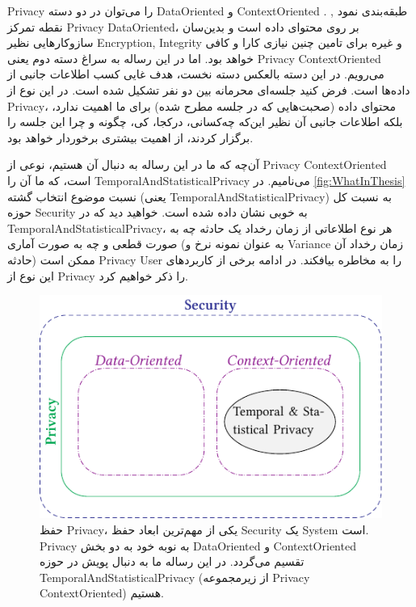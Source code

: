 \gls{Privacy}
را می‌توان در دو دسته
\gls{DataOriented} و \gls{ContextOriented}
طبقه‌بندی نمود
\cite[بخش $12.4.1$]{guizani2015future}, \cite[صفحه 202]{mason2014sensing}.
نقطه تمرکز 
\gls{Privacy} \gls{DataOriented}،
بر روی محتوای داده است و بدین‌سان سازوکارهایی نظیر 
\gls{Encryption}, \gls{Integrity} و غیره
برای تامین چنین نیازی کارا و کافی خواهد بود. اما در این رساله به سراغ دسته دوم یعنی
\gls{Privacy} \gls{ContextOriented} 
می‌رویم.  در این دسته بالعکس دسته نخست، هدف غایی کسب اطلاعات جانبی  از داده‌ها است. فرض کنید جلسه‌ای محرمانه بین دو نفر تشکیل شده است. در این نوع از 
\gls{Privacy}،
محتوای داده (صحبت‌هایی که در جلسه مطرح شده) برای ما اهمیت ندارد، بلکه اطلاعات جانبی آن نظیر  این‌که چه‌کسانی، درکجا، کی، چگونه و چرا این جلسه را برگزار کردند، از اهمیت بیشتری برخوردار خواهد بود. 

آن‌چه که ما در این رساله به دنبال آن هستیم، نوعی از 
\gls{Privacy} \gls{ContextOriented} 
است، که ما آن را
\gls{TemporalAndStatisticalPrivacy}
می‌نامیم. در
\autoref{fig:WhatInThesis}
نسبت موضوع انتخاب گشته (یعنی 
\gls{TemporalAndStatisticalPrivacy}) 
به نسبت کل حوزه
\gls{Security}
به خوبی نشان داده شده است. خواهید دید که در
\gls{TemporalAndStatisticalPrivacy}،
 هر نوع اطلاعاتی از زمان رخداد یک حادثه چه به صورت قطعی و چه به صورت آماری (به عنوان نمونه نرخ و \gls{Variance} زمان رخداد آن حادثه) 
ممکن است 
\gls{Privacy} \gls{User}
را به مخاطره بیافکند. در ادامه برخی از کاربردهای این نوع از 
\gls{Privacy}
را ذکر خواهیم کرد.
\begin{figure}
\includegraphics[width=0.6\linewidth]{Pic/WhatInThesis/mainFig}
\caption{
حفظ
\gls*{Privacy}،
یکی از مهم‌ترین ابعاد حفظ
\gls*{Security} یک \gls*{System}
است. 
\gls*{Privacy} به نوبه خود به دو بخش \gls*{DataOriented} و \gls*{ContextOriented}
تقسیم‌ می‌گردد. در این رساله ما به دنبال پویش در حوزه
\gls*{TemporalAndStatisticalPrivacy} 
(از زیرمجموعه
\gls*{Privacy} \gls*{ContextOriented})
هستیم.
}
\label{fig:WhatInThesis}
\end{figure}



